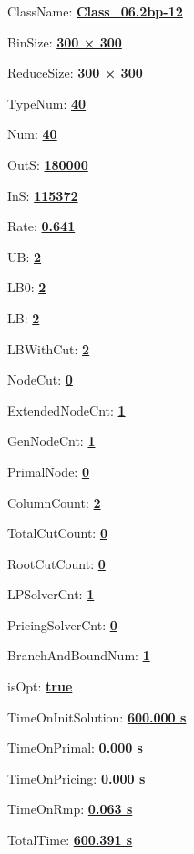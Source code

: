 \documentclass[11pt]{article}
\begin{document}
\pagestyle{empty}


ClassName: \underline{\textbf{Class_06.2bp-12}}
\par
BinSize: \underline{\textbf{300 × 300}}
\par
ReduceSize: \underline{\textbf{300 × 300}}
\par
TypeNum: \underline{\textbf{40}}
\par
Num: \underline{\textbf{40}}
\par
OutS: \underline{\textbf{180000}}
\par
InS: \underline{\textbf{115372}}
\par
Rate: \underline{\textbf{0.641}}
\par
UB: \underline{\textbf{2}}
\par
LB0: \underline{\textbf{2}}
\par
LB: \underline{\textbf{2}}
\par
LBWithCut: \underline{\textbf{2}}
\par
NodeCut: \underline{\textbf{0}}
\par
ExtendedNodeCnt: \underline{\textbf{1}}
\par
GenNodeCnt: \underline{\textbf{1}}
\par
PrimalNode: \underline{\textbf{0}}
\par
ColumnCount: \underline{\textbf{2}}
\par
TotalCutCount: \underline{\textbf{0}}
\par
RootCutCount: \underline{\textbf{0}}
\par
LPSolverCnt: \underline{\textbf{1}}
\par
PricingSolverCnt: \underline{\textbf{0}}
\par
BranchAndBoundNum: \underline{\textbf{1}}
\par
isOpt: \underline{\textbf{true}}
\par
TimeOnInitSolution: \underline{\textbf{600.000 s}}
\par
TimeOnPrimal: \underline{\textbf{0.000 s}}
\par
TimeOnPricing: \underline{\textbf{0.000 s}}
\par
TimeOnRmp: \underline{\textbf{0.063 s}}
\par
TotalTime: \underline{\textbf{600.391 s}}
\par
\newpage
\end{document}
